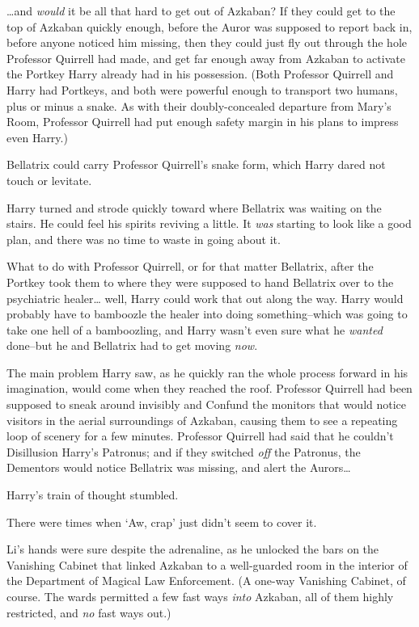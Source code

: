 {\ldots}and \emph{would} it be all that hard to get out of Azkaban? If they could get to the top of Azkaban quickly enough, before the Auror was supposed to report back in, before anyone noticed him missing, then they could just fly out through the hole Professor Quirrell had made, and get far enough away from Azkaban to activate the Portkey Harry already had in his possession. (Both Professor Quirrell and Harry had Portkeys, and both were powerful enough to transport two humans, plus or minus a snake. As with their doubly-concealed departure from Mary's Room, Professor Quirrell had put enough safety margin in his plans to impress even Harry.)

Bellatrix could carry Professor Quirrell's snake form, which Harry dared not touch or levitate.

Harry turned and strode quickly toward where Bellatrix was waiting on the stairs. He could feel his spirits reviving a little. It \emph{was} starting to look like a good plan, and there was no time to waste in going about it.

What to do with Professor Quirrell, or for that matter Bellatrix, after the Portkey took them to where they were supposed to hand Bellatrix over to the psychiatric healer{\ldots} well, Harry could work that out along the way. Harry would probably have to bamboozle the healer into doing something\---which was going to take one hell of a bamboozling, and Harry wasn't even sure what he \emph{wanted} done\---but he and Bellatrix had to get moving \emph{now}.

The main problem Harry saw, as he quickly ran the whole process forward in his imagination, would come when they reached the roof. Professor Quirrell had been supposed to sneak around invisibly and Confund the monitors that would notice visitors in the aerial surroundings of Azkaban, causing them to see a repeating loop of scenery for a few minutes. Professor Quirrell had said that he couldn't Disillusion Harry's Patronus; and if they switched \emph{off} the Patronus, the Dementors would notice Bellatrix was missing, and alert the Aurors{\ldots}

Harry's train of thought stumbled.

There were times when `Aw, crap' just didn't seem to cover it.

\later

Li's hands were sure despite the adrenaline, as he unlocked the bars on the Vanishing Cabinet that linked Azkaban to a well-guarded room in the interior of the Department of Magical Law Enforcement. (A one-way Vanishing Cabinet, of course. The wards permitted a few fast ways \emph{into} Azkaban, all of them highly restricted, and \emph{no} fast ways out.)

